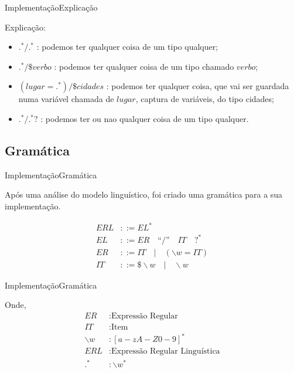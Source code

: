 \documentclass{beamer}
\begin{document}
\begin{frame}{Implementação}{Explicação}

Explicação:
\begin{itemize}
\item $.^* / .^*$ : podemos ter qualquer coisa de um tipo qualquer; \\
\item $. ^* / \$verbo$ : podemos ter qualquer coisa de um tipo chamado $verbo$; \\
\item $(lugar=.^*) / \$cidades$ : podemos ter qualquer coisa, que vai ser guardada numa variável chamada de $lugar$, captura de variáveis, do tipo cidades; \\
\item  $.^* / .^* ?$ : podemos ter ou nao qualquer coisa de um tipo qualquer.\\
\end{itemize}


\end{frame}

\subsection{Gramática}
\begin{frame}{Implementação}{Gramática}


\hspace{11pt} Após uma análise do modelo linguístico, foi criado uma gramática para a sua implementação.

\begin{align*}
ERL &::= EL^* \\
EL   &::= ER \quad \text{``/''} \quad IT \quad ?^* \\
ER   &::= IT \quad | \quad (\backslash w = IT) \\
IT   &::= \$ \backslash w \quad | \quad \backslash w
\end{align*}

\end{frame}
\begin{frame}{Implementação}{Gramática}

Onde,
\begin{align*}
ER &: \text{Expressão Regular}\\
IT &: \text{Item}\\
\backslash w &: [a-zA-Z0-9]^* \\
ERL &: \text{Expressão Regular Linguística}\\
.^* &: \backslash w^*
\end{align*}

\end{frame}
\end{document}
